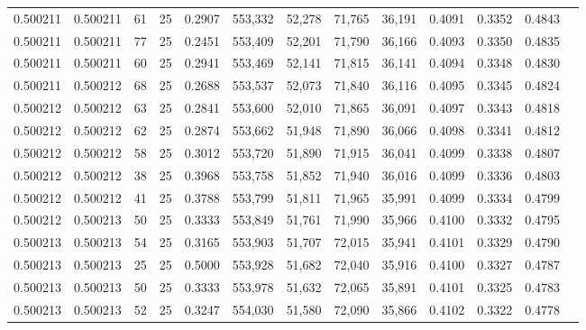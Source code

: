 \begin{tabular}{rrrrrrrrrrrrr}
0.500211 & 0.500211 &    61 &  25 &                                     0.2907 & 553,332 &  52,278 &  71,765 &  36,191 & 0.4091 & 0.3352 & 0.4843 \\
0.500211 & 0.500211 &    77 &  25 &                                     0.2451 & 553,409 &  52,201 &  71,790 &  36,166 & 0.4093 & 0.3350 & 0.4835 \\
0.500211 & 0.500211 &    60 &  25 &                                     0.2941 & 553,469 &  52,141 &  71,815 &  36,141 & 0.4094 & 0.3348 & 0.4830 \\
0.500211 & 0.500212 &    68 &  25 &                                     0.2688 & 553,537 &  52,073 &  71,840 &  36,116 & 0.4095 & 0.3345 & 0.4824 \\
0.500212 & 0.500212 &    63 &  25 &                                     0.2841 & 553,600 &  52,010 &  71,865 &  36,091 & 0.4097 & 0.3343 & 0.4818 \\
0.500212 & 0.500212 &    62 &  25 &                                     0.2874 & 553,662 &  51,948 &  71,890 &  36,066 & 0.4098 & 0.3341 & 0.4812 \\
0.500212 & 0.500212 &    58 &  25 &                                     0.3012 & 553,720 &  51,890 &  71,915 &  36,041 & 0.4099 & 0.3338 & 0.4807 \\
0.500212 & 0.500212 &    38 &  25 &                                     0.3968 & 553,758 &  51,852 &  71,940 &  36,016 & 0.4099 & 0.3336 & 0.4803 \\
0.500212 & 0.500212 &    41 &  25 &                                     0.3788 & 553,799 &  51,811 &  71,965 &  35,991 & 0.4099 & 0.3334 & 0.4799 \\
0.500212 & 0.500213 &    50 &  25 &                                     0.3333 & 553,849 &  51,761 &  71,990 &  35,966 & 0.4100 & 0.3332 & 0.4795 \\
0.500213 & 0.500213 &    54 &  25 &                                     0.3165 & 553,903 &  51,707 &  72,015 &  35,941 & 0.4101 & 0.3329 & 0.4790 \\
0.500213 & 0.500213 &    25 &  25 &                                     0.5000 & 553,928 &  51,682 &  72,040 &  35,916 & 0.4100 & 0.3327 & 0.4787 \\
0.500213 & 0.500213 &    50 &  25 &                                     0.3333 & 553,978 &  51,632 &  72,065 &  35,891 & 0.4101 & 0.3325 & 0.4783 \\
0.500213 & 0.500213 &    52 &  25 &                                     0.3247 & 554,030 &  51,580 &  72,090 &  35,866 & 0.4102 & 0.3322 & 0.4778 \\

\end{tabular}
